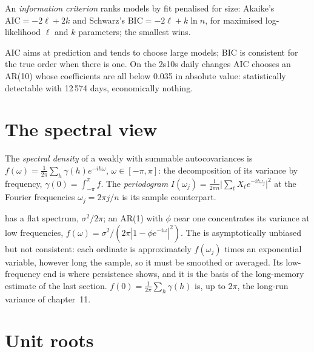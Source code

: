 \begin{definition}\label{def:qm:linear-time-series:ic}
An \emph{information criterion} ranks models by fit penalised for size: Akaike's $\mathrm{AIC} = -2\ell + 2k$ and Schwarz's
$\mathrm{BIC} = -2\ell + k\ln n$, for maximised log-likelihood $\ell$ and $k$ parameters; the smallest wins.
\end{definition}

AIC aims at prediction and tends to choose large models; BIC is consistent for the true order when there is one. On the 2s10s daily changes AIC
chooses an AR(10) whose coefficients are all below 0.035 in absolute value: statistically detectable with 12\,574 days, economically nothing.

\section{The spectral view}

\begin{definition}\label{def:qm:linear-time-series:spectral}
The \emph{spectral density} of a weakly  with summable autocovariances is $f(\omega) = \frac1{2\pi}\sum_h\gamma(h)e^{-ih\omega}$,
$\omega \in [-\pi, \pi]$: the decomposition of its variance by frequency, $\gamma(0) = \int_{-\pi}^\pi f$. The \emph{periodogram} $I(\omega_j) =
\frac1{2\pi n}\bigl\lvert\sum_tX_te^{-it\omega_j}\bigr\rvert^2$ at the Fourier frequencies $\omega_j = 2\pi j/n$ is its sample counterpart.
\end{definition}

 has a flat spectrum, $\sigma^2/2\pi$; an AR(1) with $\phi$ near one concentrates its variance at low frequencies, $f(\omega) =
\sigma^2/(2\pi|1 - \phi e^{-i\omega}|^2)$. The  is asymptotically unbiased but not consistent: each ordinate is approximately $f(\omega_j)$ times
an exponential variable, however long the sample, so it must be smoothed or averaged. Its low-frequency end is where persistence shows, and it is
the basis of the long-memory estimate of the last section. $f(0) = \frac1{2\pi}\sum_h\gamma(h)$ is, up to $2\pi$, the long-run variance of
chapter~11.

\section{Unit roots}

